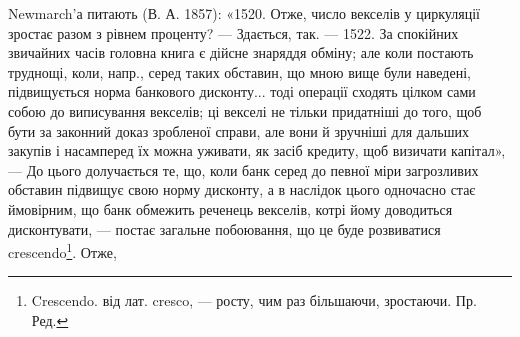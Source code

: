 Newmarch’а питають (В. А. 1857): «1520. Отже, число векселів у циркуляції
зростає разом з рівнем проценту? — Здається, так. — 1522. За спокійних
звичайних часів головна книга є дійсне знаряддя обміну; але коли постають
труднощі, коли, напр., серед таких обставин, що мною вище були наведені, підвищується
норма банкового дисконту... тоді операції сходять цілком сами собою
до виписування векселів; ці векселі не тільки придатніші до того, щоб бути за
законний доказ зробленої справи, але вони й зручніші для дальших закупів
і насамперед їх можна уживати, як засіб кредиту, щоб визичати капітал», —
До цього долучається те, що, коли банк серед до певної міри загрозливих обставин
підвищує свою норму дисконту, а в наслідок цього одночасно стає ймовірним,
що банк обмежить реченець векселів, котрі йому доводиться дисконтувати,
— постає загальне побоювання, що це буде розвиватися crescendo\footnote{
Crescendo. від лат. cresco, — росту, чим раз більшаючи, зростаючи. Пр. Ред.
}. Отже,
\parbreak{}  %
